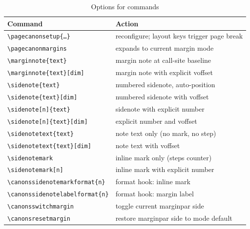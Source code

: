\documentclass[11pt, twoside, openany]{book}
\newcommand{\cmd}[1]{\texttt{\textbackslash #1}}
\begin{document}
\begin{table}
	\centering
	\caption{Options for commands}
	\label{tab:commandsoptions}
	\begin{tabular}{ll}
		\textbf{Command}                              & \textbf{Action}                             \\
		\hline
		\cmd{pagecanonsetup}\texttt{\{\ldots\}}       & reconfigure; layout keys trigger page break \\
		\cmd{pagecanonmargins}                        & expands to current margin mode              \\[3pt]
		\cmd{marginnote}\texttt{\{text\}}             & margin note at call-site baseline           \\
		\cmd{marginnote}\texttt{\{text\}[dim]}        & margin note with explicit voffset           \\[3pt]
		\cmd{sidenote}\texttt{\{text\}}               & numbered sidenote, auto-position            \\
		\cmd{sidenote}\texttt{\{text\}[dim]}          & numbered sidenote with voffset              \\
		\cmd{sidenote}\texttt{[n]\{text\}}            & sidenote with explicit number               \\
		\cmd{sidenote}\texttt{[n]\{text\}[dim]}       & explicit number and voffset                 \\
		\cmd{sidenotetext}\texttt{\{text\}}           & note text only (no mark, no step)           \\
		\cmd{sidenotetext}\texttt{\{text\}[dim]}      & note text with voffset                      \\
		\cmd{sidenotemark}                            & inline mark only (steps counter)            \\
		\cmd{sidenotemark}\texttt{[n]}                & inline mark with explicit number            \\[3pt]
		\cmd{canonssidenotemarkformat}\texttt{\{n\}}  & format hook: inline mark                    \\
		\cmd{canonssidenotelabelformat}\texttt{\{n\}} & format hook: margin label                   \\[3pt]
		\cmd{canonsswitchmargin}                      & toggle current marginpar side               \\
		\cmd{canonsresetmargin}                       & restore marginpar side to mode default      \\
	\end{tabular}
\end{table}
\end{document}
